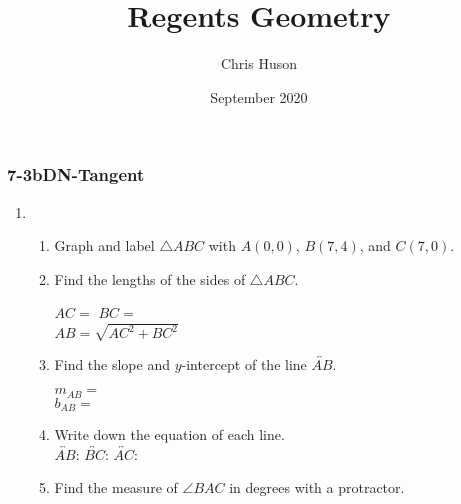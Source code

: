 \documentclass[12pt, twoside]{article}
\title{Regents Geometry}
\author{Chris Huson}
\date{September 2020}
\begin{document}
\subsubsection*{7-3bDN-Tangent}
\begin{enumerate}
\item \begin{enumerate}
    \item Graph and label $\triangle ABC$ with $A(0,0)$, $B(7,4)$, and $C(7,0)$.
    \begin{center}
    \end{center}
    \item Find the lengths of the sides of $\triangle ABC$.
    \begin{multicols}{2}
      $AC=$ \hspace{3cm}
      $BC=$ \\[1cm]
      $AB=\sqrt{AC^2+BC^2}$
    \end{multicols} \vspace{2.5cm}
    \item Find the slope and $y$-intercept of the line $\overleftrightarrow{AB}$.
      \begin{multicols}{2}
        $m_{AB}=$ \\
        $b_{AB}=$
      \end{multicols} \vspace{0.5cm}
    \item Write down the equation of each line. \\[0.5cm]
      $\overleftrightarrow{AB}$: \hfill
      $\overleftrightarrow{BC}$: \hfill
      $\overleftrightarrow{AC}$: \hspace{2cm}
    \vspace{2cm}
    \item Find the measure of $\angle BAC$ in degrees with a protractor.
  \end{enumerate}


\end{enumerate}
\end{document}
